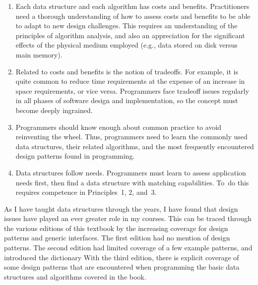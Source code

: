 \begin{enumerate}

\item
Each data structure and each algorithm has costs and
benefits.
Practitioners need a thorough understanding of how to assess costs and
benefits to be able to adapt to new design challenges.
This requires an understanding of the principles of
algorithm analysis,
and also an appreciation for the significant effects of the physical
medium employed (e.g., data stored on disk versus main memory).

\item
Related to costs and benefits is the notion of
tradeoffs.
For example, it is quite common to reduce time requirements at the
expense of an increase in space requirements, or vice versa.
Programmers face tradeoff issues regularly in all phases of software
design and implementation, so the concept must become deeply ingrained.

\item
Programmers should know enough about common practice to avoid
reinventing the wheel.
Thus, programmers need to learn the commonly used data
structures, their related algorithms, and the most frequently
encountered design patterns found in programming.

\item
Data structures follow needs.
Programmers must learn to assess application needs first,
then find a data structure with matching capabilities.
To~do this requires competence in Principles~1, 2,
and~3.

\end{enumerate}

As I have taught data structures through the years, I have found that
design issues have played an ever greater role in my courses.
This can be traced through the various editions of this textbook by
the increasing coverage for design patterns and generic interfaces.
The first edition had no mention of design patterns.
The second edition had limited coverage of a few example patterns, and
introduced the
dictionary
With the third edition, there is explicit coverage of some design
patterns that are encountered when programming the basic data
structures and algorithms covered in the book.

